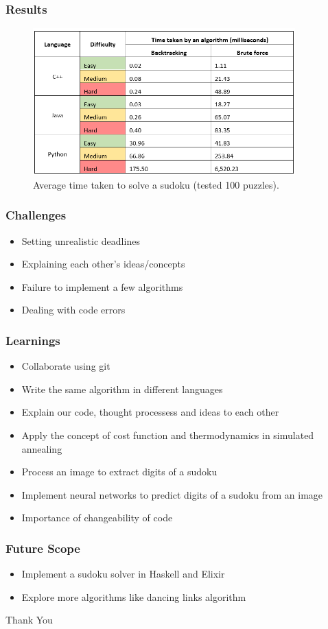 \documentclass{beamer}
\begin{document}
\begin{frame}
     \frametitle{Results}   
		  \begin{figure}
		  \includegraphics[width=0.9\textwidth]{./week9_img/data.png}
		  \caption{Average time taken to solve a sudoku (tested 100 puzzles).}
		  \centering
		  \end{figure}
\end{frame}

\begin{frame}
    \frametitle{Challenges}   
    \begin{itemize}
         \item Setting unrealistic deadlines
         \item Explaining each other’s ideas/concepts
         \item Failure to implement a few algorithms
         \item Dealing with code errors
    \end{itemize}
\end{frame}

\begin{frame}
     \frametitle{Learnings}
     \begin{itemize}
		 \item Collaborate using git 
		 \item Write the same algorithm in different languages
		 \item Explain our code, thought processess and ideas to each other
		 \item Apply the concept of cost function and thermodynamics in simulated annealing
		 \item Process an image to extract digits of a sudoku
		 \item Implement neural networks to predict digits of a sudoku from an image
		 \item Importance of changeability of code
	 \end{itemize}
\end{frame}

\begin{frame}
    \frametitle{Future Scope}   
    \begin{itemize}
         \item Implement a sudoku solver in Haskell and Elixir
         \item Explore more algorithms like dancing links algorithm
    \end{itemize}
\end{frame}

\begin{frame}
    \centering \huge \huge {Thank You}
\end{frame}
\end{document}
